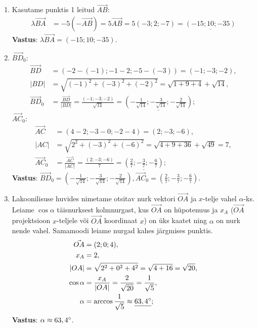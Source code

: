 \documentclass[10pt, a4paper]{article}
\begin{document}
\begin{enumerate}
\item
    Kasutame punktis 1 leitud $\vec{AB}$:
    \begin{align}
        \nonumber
        \lambda\vec{BA} &= -5(-\vec{AB}) = 5\vec{AB} = 5(-3; 2; -7) = 
        \underline{(-15; 10; -35)}
    \end{align}
    \textbf{Vastus}: $\lambda\vec{BA} = (-15; 10; -35)$.

\item
    $\vec{BD}_0$:
    \begin{align}
        \nonumber
        \vec{BD} &= (-2 - (-1); -1 - 2; -5 - (-3)) = (-1; -3; -2),\\ 
        \nonumber
        \lvert BD \rvert &= \sqrt{(-1)^2 + (-3)^2 + (-2)^2} = \sqrt{1 + 9 + 4} + \sqrt{14}, \\ 
        \nonumber
        \vec{BD}_0 &= \frac{\vec{BD}}{\lvert BD \rvert} = \frac{(-1; -3; -2)}{\sqrt{14}} = \underline{(-\frac{1}{\sqrt{14}}; -\frac{3}{\sqrt{14}}; -\frac{2}{\sqrt{14}})};
    \end{align}    
    $\vec{AC}_0$:    
    \begin{align}
        \nonumber
        \vec{AC} &= (4 - 2; -3 - 0; -2 - 4) = (2; -3; -6),\\
        \nonumber
        \lvert AC \rvert &= \sqrt{2^2 + (-3)^2 + (-6)^2} = \sqrt{4 + 9 + 36} + \sqrt{49} = 7,\\ 
        \nonumber
        \vec{AC}_0 &= \frac{\vec{AC}}{\lvert AC \rvert} = \frac{(2; -3; -6)}{7} = \underline{(\frac{2}{7}; -\frac{3}{7}; -\frac{6}{7})};
    \end{align}
    \textbf{Vastus}: $\vec{BD}_0 = (-\frac{1}{\sqrt{14}}; -\frac{3}{\sqrt{14}}; -\frac{2}{\sqrt{14}}), \vec{AC}_0 = (\frac{2}{7}; -\frac{3}{7}; -\frac{6}{7})$.

\item
    Lakoonilisuse huvides nimetame otsitav nurk vektori $\vec{OA}$ ja $x$-telje vahel $\alpha$-ks.\\
    Leiame $\cos \alpha$ täisnurksest kolmnurgast, kus $\vec{OA}$ on hüpotenuus ja $x_A$ ($\vec{OA}$ projektsioon $x$-teljele või $\vec{OA}$ koordinaat $x$) on üks kaatet ning $\alpha$ on nurk nende vahel. Samamoodi leiame nurgad kahes järgmises punktis.
    \begin{align}
        \nonumber
        \vec{OA} &= (2; 0; 4), \\
        \nonumber
        x_A &= 2, \\
        \nonumber
        \lvert OA \lvert &= \sqrt{2^2 + 0^2 + 4^2} = \sqrt{4 + 16} = \sqrt{20}, \\
        \nonumber
        \cos \alpha &= \frac{x_A}{\lvert OA \lvert} = \frac{2}{\sqrt{20}} = \frac{1}{\sqrt{5}},\\
        \nonumber
        \alpha &= \arccos \frac{1}{\sqrt{5}} \approx \underline{63,4\degree};
    \end{align}
    \textbf{Vastus}: $\alpha \approx 63,4\degree$.


\end{enumerate}
\end{document}
